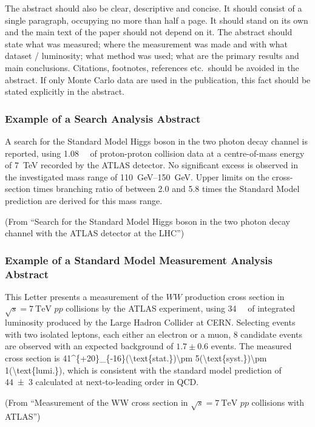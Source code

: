\documentclass[PAPER,UKenglish]{latex/atlasdoc}
\begin{document}
The abstract should also be clear, descriptive and concise. 
It should consist of a single paragraph, occupying no more than half a page. 
It should stand on its own and the main text of the paper should not depend on it. 
The abstract should state what was measured; where the measurement was made and with what dataset / luminosity;
what method was used; 
what are the primary results and main conclusions. 
Citations, footnotes, references etc.\ should be avoided in the abstract. 
If only Monte Carlo data are used in the publication, this fact should be stated explicitly in the abstract.  


\subsubsection*{Example of a Search Analysis Abstract}

A search for the Standard Model Higgs boson in the two photon decay channel is reported, 
using \SI{1.08}{\per\fb} of proton-proton collision data at a centre-of-mass energy of \SI{7}{\TeV} recorded by the ATLAS detector.
No significant excess is observed in the investigated mass range of \SIrange{110}{150}{\GeV}. 
Upper limits on the cross-section times branching ratio of between 2.0 and 5.8 times the Standard Model prediction are derived for this mass range.

\noindent(From \enquote{Search for the Standard Model Higgs boson in the two photon decay channel with the ATLAS detector at the LHC})

\subsubsection*{Example of a Standard Model Measurement Analysis Abstract}

This Letter presents a measurement of the $WW$ production cross section in $\sqrt{s} = \SI{7}{\TeV}$ $pp$ collisions by the ATLAS experiment, using \SI{34}{\per\pb} of integrated luminosity produced by the Large Hadron Collider at CERN. Selecting events with two isolated leptons, each either an electron or a muon, 8 candidate events are observed with an expected background of $1.7 \pm 0.6$ events.
The measured cross section is 
\SI[parse-numbers=false]{41^{+20}_{-16}(\text{stat.})\pm 5(\text{syst.})\pm 1(\text{lumi.})}{\pb}, 
which is consistent with the standard model prediction of \SI{44 \pm 3}{\pb} calculated at next-to-leading order in QCD. 

\noindent(From \enquote{Measurement of the WW cross section in $\sqrt{s} = \SI{7}{\TeV}$ $pp$ collisions with ATLAS})
\end{document}
